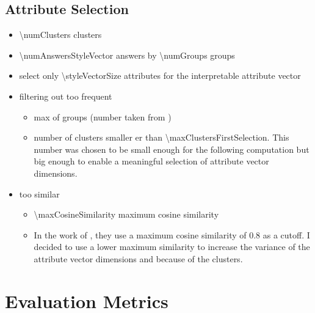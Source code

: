 \subsection{Attribute Selection}
\begin{itemize}
  \item \num{\numClusters} clusters
  \item \num{\numAnswersStyleVector} answers by \num{\numGroups} groups
  \item select only \num{\styleVectorSize} attributes for the interpretable attribute vector
  \item filtering out too frequent
        \begin{itemize}
          \item max \clusterMaxGroupRatio{} of groups (number taken from \citet{patelLearningInterpretableStyle2023})
          \item number of clusters smaller er than \num{\maxClustersFirstSelection}. This number was chosen to be small enough for the following computation but big enough to enable a meaningful selection of attribute vector dimensions.
        \end{itemize}
  \item too similar
        \begin{itemize}
          \item \num{\maxCosineSimilarity} maximum cosine similarity
          \item In the work of \citeauthor{patelLearningInterpretableStyle2023}, they use a maximum cosine similarity of \num{0.8} as a cutoff. I decided to use a lower maximum similarity to increase the variance of the attribute vector dimensions and because of the clusters. %
        \end{itemize}
\end{itemize}

\begin{figure}
  \begin{center}
    
  \end{center}
\end{figure}


\section{Evaluation Metrics}
\label{sec:approach:evaluationMetrics}

